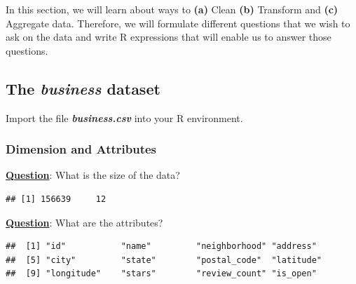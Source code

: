 \begin{HIGHLIGHT}
\par{}
\end{HIGHLIGHT}

\noindent In this section, we will learn about ways to  \textbf{(a)} Clean \textbf{(b)} Transform and \textbf{(c)} Aggregate data. 
Therefore, we will formulate different questions that we wish to ask on the data and write R expressions that will enable us to answer those questions.

\subsection{The \textbf{\emph{business}} dataset}

\noindent Import the file \emph{\textbf{business.csv}} into your R environment. 


\subsubsection{Dimension and Attributes}
\noindent \textbf{\underline{Question}}: What is the size of the data?
\begin{knitrout}
\color{fgcolor}\begin{kframe}
\begin{alltt}
\end{alltt}
\begin{verbatim}
## [1] 156639     12
\end{verbatim}
\begin{alltt}
\end{alltt}
\end{kframe}
\end{knitrout}

\noindent \textbf{\underline{Question}}: What are the attributes?
\begin{knitrout}
\color{fgcolor}\begin{kframe}
\begin{alltt}
\end{alltt}
\begin{verbatim}
##  [1] "id"           "name"         "neighborhood" "address"     
##  [5] "city"         "state"        "postal_code"  "latitude"    
##  [9] "longitude"    "stars"        "review_count" "is_open"
\end{verbatim}
\begin{alltt}
\end{alltt}
\end{kframe}
\end{knitrout}


